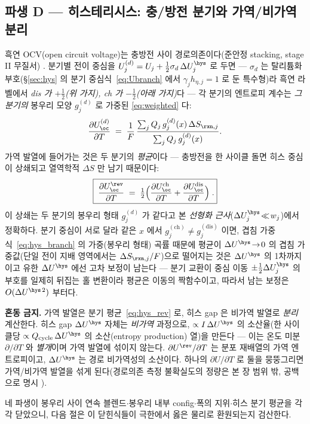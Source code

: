 \subsection{파생 D --- 히스테리시스: 충/방전 분기와 가역/비가역 분리}\label{ssec:hys}
흑연 OCV(open circuit voltage)는 충방전 사이 경로의존이다(준안정 stacking, stage II 무질서)
\cite{hysteresis2018}. 분기별 전이 중심을 $U_j^{(d)}=U_j+\tfrac12\sigma_d\,\Delta U_j^\hys$ 로 두면 --- $\sigma_d$
는 탈리튬화 부호(\S\ref{sec:hys} 의 분기 중심식~\eqref{eq:Ubranch} 에서 $\gamma_jh_{\eta,j}{=}1$ 로 둔 특수형)라 흑연 라벨에서 \emph{dis 가
$+\tfrac12$(위 가지), ch 가 $-\tfrac12$(아래 가지)}다 --- 각 분기의 엔트로피 계수는 \emph{그 분기의} 봉우리
모양 $g_j^{(d)}$ 로 가중된 \eqref{eq:weighted} 다:
\begin{equation}
\frac{\partial U_\oc^{(d)}}{\partial T}
\;=\;\frac1F\,\frac{\sum_j Q_j\,g_j^{(d)}(x)\,\Delta S_{\rxn,j}}{\sum_j Q_j\,g_j^{(d)}(x)}.
\label{eq:hys_branch}
\end{equation}
가역 발열에 들어가는 것은 두 분기의 \emph{평균}이다 --- 충방전을 한 사이클 돌면 히스 중심이 상쇄되고 열역학적
$\Delta S$ 만 남기 때문이다:
\begin{equation}
\boxed{\;\frac{\partial U_\oc^\rev}{\partial T}
\;=\;\tfrac12\Bigl(\frac{\partial U_\oc^\mathrm{ch}}{\partial T}+\frac{\partial U_\oc^\mathrm{dis}}{\partial T}\Bigr)\;.}
\label{eq:hys_rev}
\end{equation}
이 상쇄는 두 분기의 봉우리 형태 $g_j^{(d)}$ 가 같다고 본 \emph{선형화 근사}($\Delta U_j^\hys\!\ll\!w_j$)에서
정확하다. 분기 중심이 서로 달라 같은 $x$ 에서 $g_j^{(\mathrm{ch})}\!\ne\!g_j^{(\mathrm{dis})}$ 이면, 겹침
가중식~\eqref{eq:hys_branch} 의 가중(봉우리 형태) 곡률 때문에 평균이 $\Delta U^\hys\!\to\!0$ 의 겹침
가중값(단일 전이 지배 영역에서는 $\Delta S_{\rxn,j}/F$)으로 떨어지는 것은 $\Delta U^\hys$ 의 1차까지이고
유한 $\Delta U^\hys$ 에선 고차 보정이 남는다 --- 분기 교환이 중심 이동 $\pm\tfrac12\Delta U_j^\hys$ 의 부호를
일제히 뒤집는 홀 변환이라 평균은 이동의 짝함수이고, 따라서 남는 보정은 $O(\Delta U^{\hys\,2})$ 부터다.
\begin{warnbox}
\textbf{혼동 금지.} 가역 발열은 분기 평균~\eqref{eq:hys_rev} 로, 히스 gap 은 비가역 발열로 \emph{분리} 계산한다.
히스 gap $\Delta U^\hys$ 자체는 \emph{비가역} 과정으로, $\propto I\,\Delta U^\hys$ 의 소산율(한 사이클당
$\propto Q_\mathrm{cycle}\,\Delta U^\hys$ 의 소산(entropy production) 열)을 만든다 --- 이는 온도 미분
$\partial/\partial T$ 와 \emph{별개}이며 가역 발열에 섞이지 않는다. $\partial U^\rev/\partial T$ 는 분포 재배열의
가역 엔트로피이고, $\Delta U^\hys$ 는 경로 비가역성의 소산이다. 하나의 $\partial U/\partial T$ 로 둘을
뭉뚱그리면 가역/비가역 발열을 섞게 된다(경로의존 측정 불확실도의 정량은 본 장 범위 밖, 공백으로 명시
\cite{hysteresis2018}).
\end{warnbox}
네 파생이 봉우리 사이 연속 블렌드$\cdot$봉우리 내부 config$\cdot$폭의 지위$\cdot$히스 분기 평균을 각각 닫았으니,
다음 절은 이 닫힌식들이 극한에서 옳은 물리로 환원되는지 검산한다.

